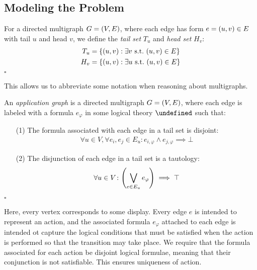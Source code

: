\documentclass[12pt]{article}
\newcommand{\form}{\ensuremath{\varphi}}
\let\domform\undefined
\newcommand{\domform}{\ensuremath{\mathcal{F}}}
\begin{document}
\subsection{Modeling the Problem}
\begin{definition}
For a directed multigraph $G = {\left(V, E\right)}$,
where each edge has form $e = {\left(u, v\right)} \in E$ with tail $u$ and head $v$,
we define the \textit{tail set} $T_u$ and \textit{head set} $H_v$:
\begin{align*}
  T_u &= {\left\{{\left(u, v\right)} : \exists v {\ \mathrm{s.t.}\ } {\left(u, v\right)} \in E\right\}} \\
  H_v &= {\left\{{\left(u, v\right)} : \exists u {\ \mathrm{s.t.}\ } {\left(u, v\right)} \in E\right\}}
\end{align*}
$\square$
\end{definition}

This allows us to abbreviate some notation when reasoning about multigraphs.

\begin{definition}
An \textit{application graph} is a directed multigraph $G = {\left(V, E\right)}$,
where each edge is labeled with a formula $e_{\form}$ in some logical
theory $\domform$ such that:
\begin{enumerate}
  \item[(1)]
    The formula associated with each edge in a tail set is disjoint:
    \begin{align*}
      \forall u \in V,
      \forall e_i, e_j \in E_u
      \colon
      e_{i, \form} \land e_{j, \form} \implies \bot
    \end{align*}

  \item[(2)]
    The disjunction of each edge in a tail set is a tautology:
    \begin{align*}
      \forall u \in V
      \colon
      \parens{\bigvee_{e \in E_u} e_{\form}} \implies \top
    \end{align*}
\end{enumerate}
$\square$
\end{definition}

Here, every vertex corresponds to some display.
Every edge $e$ is intended to represent an action, and the associated
formula $e_{\form}$ attached to each edge is intended ot capture the
logical conditions that must be satisfied when the action is performed
so that the transition may take place.
We require that the formula associated for each action be disjoint logical
formulae, meaning that their conjunction is not satisfiable.
This ensures uniqueness of action.
\end{document}
